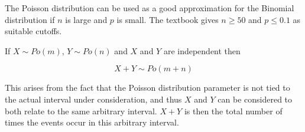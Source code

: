 \documentclass[a5paper]{article}
\begin{document}
The Poisson distribution can be used as a good approximation for the Binomial
distribution if $n$ is large and $p$ is small. The textbook gives \mbox{$n\ge 50$} and
$p\le 0.1$ as suitable cutoffs.

If $X\sim Po(m)$, $Y\sim Po(n)$ and $X$ and $Y$ are independent then

\begin{equation}
  X + Y\sim Po(m + n)
\end{equation}

This arises from the fact that the Poisson distribution parameter is not tied to
the actual interval under consideration, and thus $X$ and $Y$ can be considered
to both relate to the same arbitrary interval. $X + Y$ is then the total number
of times the events occur in this arbitrary interval.
\end{document}
